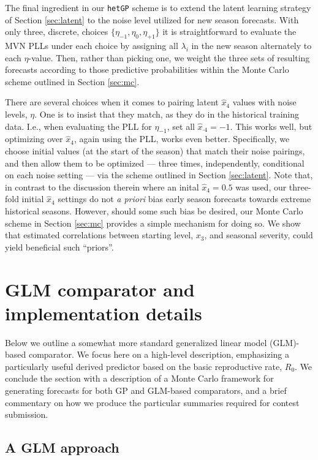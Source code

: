 \documentclass[12pt]{article}
\begin{document}
The final ingredient in our {\tt hetGP} scheme is to extend the latent
learning strategy of Section \ref{sec:latent} to the noise level utilized for
new season forecasts.  With only three, discrete, choices
$\{\eta_{-1},\eta_0,\eta_{+1}\}$ it is straightforward to evaluate the MVN
PLLs under each choice by assigning all $\lambda_i$ in the new season
alternately to each $\eta$-value. Then, rather than picking one, we weight the
three sets of resulting forecasts according to those predictive probabilities
within the Monte Carlo scheme outlined in Section \ref{sec:mc}.  

There are several choices when it comes to pairing latent $\hat{x}_4$ values
with noise levels, $\eta$.  One is to insist that they match, as they do in
the historical training data.  I.e., when evaluating the PLL for $\eta_{-1}$,
set all $\hat{x}_{\cdot 4} = -1$.  This works well, but optimizing over
$\hat{x}_4$, again using the PLL, works even better. Specifically, we choose
initial values (at the start of the season) that match their noise pairings,
and then allow them to be optimized --- three times, independently, conditional
on each noise setting --- via the scheme outlined in Section \ref{sec:latent}.
Note that, in contrast to the discussion therein where an inital $\hat{x}_4 =
0.5$ was used, our three-fold initial $\hat{x}_4$ settings do not {\em a
priori} bias early season forecasts towards extreme historical seasons.
However, should some such bias be desired, our Monte Carlo scheme in Section
\ref{sec:mc} provides a simple mechanism for doing so.  We show that estimated correlations between starting level, $x_3$, and seasonal severity,
could yield beneficial such ``priors''.

\section{GLM comparator and implementation details}
\label{sec:implement}

Below we outline a somewhat more standard generalized linear model (GLM)-based
comparator.  We focus here on a high-level description, emphasizing a
particularly useful derived predictor based on the basic reproductive rate,
$R_0$.   We conclude the section with a description of a Monte
Carlo framework for generating forecasts for both GP and GLM-based
comparators, and a brief commentary on how we produce the particular summaries
required for contest submission.

\subsection{A GLM approach}
\label{sec:glm}
\end{document}
